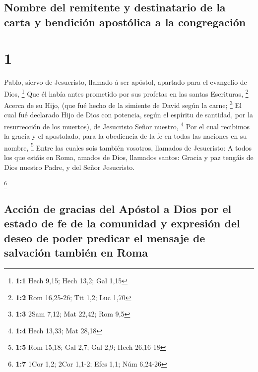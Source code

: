 \hypertarget{nombre-del-remitente-y-destinatario-de-la-carta-y-bendiciuxf3n-apostuxf3lica-a-la-congregaciuxf3n}{%
\subsection{Nombre del remitente y destinatario de la carta y bendición
apostólica a la
congregación}\label{nombre-del-remitente-y-destinatario-de-la-carta-y-bendiciuxf3n-apostuxf3lica-a-la-congregaciuxf3n}}

\hypertarget{section}{%
\section{1}\label{section}}

 Pablo, siervo de Jesucristo, llamado á ser apóstol,
apartado para el evangelio de Dios, \footnote{\textbf{1:1} Hech 9,15;
  Hech 13,2; Gal 1,15}  Que él había antes prometido por sus
profetas en las santas Escrituras, \footnote{\textbf{1:2} Rom 16,25-26;
  Tit 1,2; Luc 1,70}  Acerca de su Hijo, (que fué hecho de
la simiente de David según la carne; \footnote{\textbf{1:3} 2Sam 7,12;
  Mat 22,42; Rom 9,5}  El cual fué declarado Hijo de Dios
con potencia, según el espíritu de santidad, por la resurrección de los
muertos), de Jesucristo Señor nuestro, \footnote{\textbf{1:4} Hech
  13,33; Mat 28,18}  Por el cual recibimos la gracia y el
apostolado, para la obediencia de la fe en todas las naciones en su
nombre, \footnote{\textbf{1:5} Rom 15,18; Gal 2,7; Gal 2,9; Hech
  26,16-18}  Entre las cuales sois también vosotros,
llamados de Jesucristo:  A todos los que estáis en Roma,
amados de Dios, llamados santos: Gracia y paz tengáis de Dios nuestro
Padre, y del Señor Jesucristo.

\footnote{\textbf{1:7} 1Cor 1,2; 2Cor 1,1-2; Efes 1,1; Núm 6,24-26}

\hypertarget{acciuxf3n-de-gracias-del-apuxf3stol-a-dios-por-el-estado-de-fe-de-la-comunidad-y-expresiuxf3n-del-deseo-de-poder-predicar-el-mensaje-de-salvaciuxf3n-tambiuxe9n-en-roma}{%
\subsection{Acción de gracias del Apóstol a Dios por el estado de fe de
la comunidad y expresión del deseo de poder predicar el mensaje de
salvación también en
Roma}\label{acciuxf3n-de-gracias-del-apuxf3stol-a-dios-por-el-estado-de-fe-de-la-comunidad-y-expresiuxf3n-del-deseo-de-poder-predicar-el-mensaje-de-salvaciuxf3n-tambiuxe9n-en-roma}}


